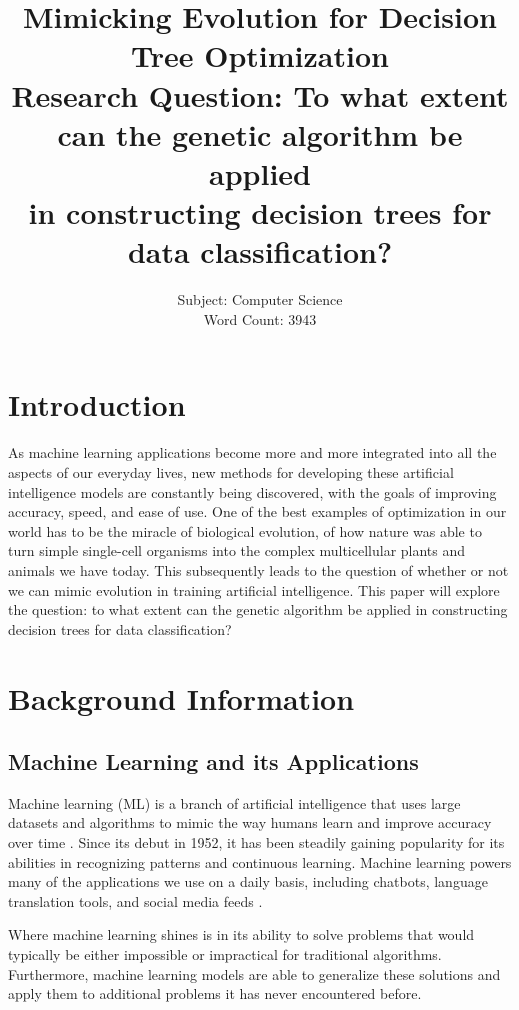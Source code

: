 \documentclass[12pt]{article}
\title{
    Mimicking Evolution for Decision Tree Optimization \\ [6pt]
    \large Research Question: To what extent can the genetic algorithm be applied \\
    in constructing decision trees for data classification?
}
\author{
    Subject: Computer Science \\
    Word Count: 3943
}
\date{} %
\begin{document}
\maketitle
\thispagestyle{empty} %
\newpage
{} %
\tableofcontents
\newpage

\section{Introduction}

As machine learning applications become more and more integrated into all the aspects of our everyday lives, new methods for developing these artificial intelligence models are constantly being discovered, with the goals of improving accuracy, speed, and ease of use. One of the best examples of optimization in our world has to be the miracle of biological evolution, of how nature was able to turn simple single-cell organisms into the complex multicellular plants and animals we have today. This subsequently leads to the question of whether or not we can mimic evolution in training artificial intelligence. This paper will explore the question: to what extent can the genetic algorithm be applied in constructing decision trees for data classification?

\section{Background Information}

\subsection{Machine Learning and its Applications}

Machine learning (ML) is a branch of artificial intelligence that uses large datasets and algorithms to mimic the way humans learn and improve accuracy over time \autocite{what_is_ml_ibm}. Since its debut in 1952, it has been steadily gaining popularity for its abilities in recognizing patterns and continuous learning. Machine learning powers many of the applications we use on a daily basis, including chatbots, language translation tools, and social media feeds \autocite{what_is_ml_mit}.

Where machine learning shines is in its ability to solve problems that would typically be either impossible or impractical for traditional algorithms. Furthermore, machine learning models are able to generalize these solutions and apply them to additional problems it has never encountered before.
\end{document}
